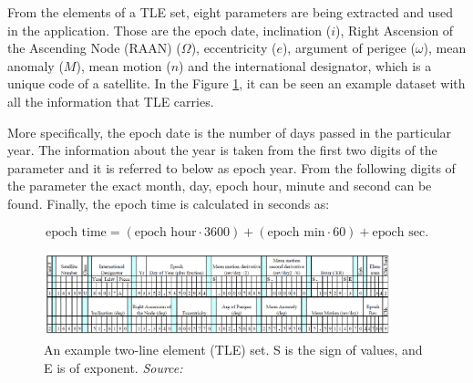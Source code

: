 From the elements of a TLE set, eight parameters are being extracted and used in the application. Those are the epoch date, inclination ($i$), Right Ascension of the Ascending Node (RAAN) ($\Omega$), eccentricity ($e$), argument of perigee ($\omega$), mean anomaly ($M$), mean motion ($n$) and the international designator, which is a unique code of a satellite. In the Figure \ref{tle}, it can be seen an example dataset with all the information that TLE carries.


More specifically, the epoch date is the number of days passed in the particular year. The information about the year is taken from the first two digits of the parameter and it is referred to below as epoch year. From the following digits of the parameter the exact month, day, epoch hour, minute and second can be found. Finally, the epoch time is calculated in seconds as:

\begin{equation}
\label{epoch}
\text{epoch time} = (\text{epoch hour} \cdot 3600) + (\text{epoch min} \cdot 60) + \text{epoch sec}.
\end{equation}


\begin{figure}
\centering
\includegraphics[width=0.9\textwidth]{Images/tle.png}\caption{An example two-line element (TLE) set. S is the sign of values, and E is of exponent. \textit{Source: \cite{Vallado}}}
\label{tle} 
\end{figure}

